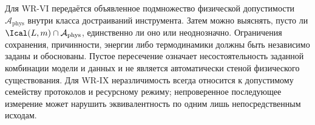{Для WR-VI передаётся объявленное подмножество физической допустимости $\mathcal A_{\mathrm{phys}}$ внутри класса достраиваний инструмента. Затем можно выяснять, пусто ли $\Ical(L,m)\cap\mathcal A_{\mathrm{phys}}$, единственно ли оно или неоднозначно. Ограничения сохранения, причинности, энергии либо термодинамики должны быть независимо заданы и обоснованы. Пустое пересечение означает несостоятельность заданной комбинации модели и данных и не является автоматически стеной физического существования. Для WR-IX неразличимость всегда относится к допустимому семейству протоколов и ресурсному режиму; непроверенное последующее измерение может нарушить эквивалентность по одним лишь непосредственным исходам.}

